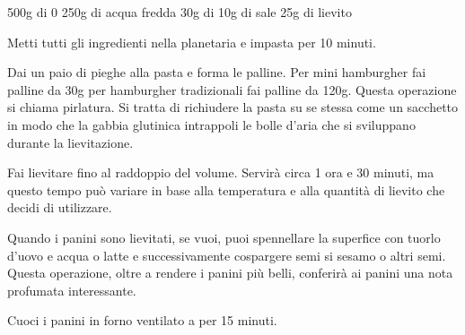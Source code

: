 \label{panini-hamburger}
\begin{ingreds}
	500g di  0
	250g di acqua fredda
	30g di 
	10g di sale
	25g di lievito
\end{ingreds}

\begin{method}
	Metti tutti gli ingredienti nella planetaria e impasta per 10 minuti.

	Dai un paio di pieghe alla pasta e forma le palline. Per mini hamburgher fai palline da 30g per hamburgher tradizionali fai palline da 120g. Questa operazione si chiama pirlatura. Si tratta di richiudere la pasta su se stessa come un sacchetto in modo che la gabbia glutinica intrappoli le bolle d'aria che si sviluppano durante la lievitazione.

	Fai lievitare fino al raddoppio del volume. Servirà circa 1 ora e 30 minuti, ma questo tempo può variare in base alla temperatura e alla quantità di lievito che decidi di utilizzare.
	
	Quando i panini sono lievitati, se vuoi, puoi spennellare la superfice con tuorlo d'uovo e acqua o latte e successivamente cospargere semi si sesamo o altri semi. Questa operazione, oltre a rendere i panini più belli, conferirà ai panini una nota profumata interessante.

	Cuoci i panini in forno ventilato a  per 15 minuti.

\end{method}

